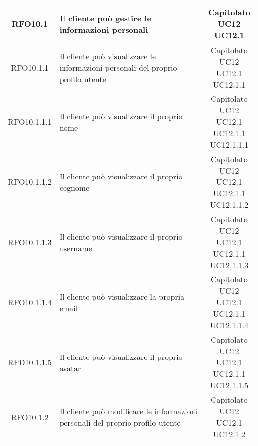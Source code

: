 \begin{longtable}{|c|p{8cm}|c|}
\hypertarget{RFO10.1}{RFO10.1} & Il cliente può gestire le informazioni personali & \makecell*{Capitolato\\UC12\\UC12.1} \\
\hline

\hypertarget{RFO10.1.1}{RFO10.1.1} & Il cliente può visualizzare le informazioni personali del proprio profilo utente &\makecell*{Capitolato\\UC12\\UC12.1\\UC12.1.1} \\
\hline

\hypertarget{RFO10.1.1.1}{RFO10.1.1.1} & Il cliente può visualizzare il proprio nome & \makecell*{Capitolato\\UC12\\UC12.1\\UC12.1.1\\UC12.1.1.1} \\
\hline
\hypertarget{RFO10.1.1.2}{RFO10.1.1.2} & Il cliente può visualizzare il proprio cognome & \makecell*{Capitolato\\UC12\\UC12.1\\UC12.1.1\\UC12.1.1.2} \\
\hline
\hypertarget{RFO10.1.1.3}{RFO10.1.1.3} & Il cliente può visualizzare il proprio username & \makecell*{Capitolato\\UC12\\UC12.1\\UC12.1.1\\UC12.1.1.3} \\
\hline
\hypertarget{RFO10.1.1.4}{RFO10.1.1.4} & Il cliente può visualizzare la propria email & \makecell*{Capitolato\\UC12\\UC12.1\\UC12.1.1\\UC12.1.1.4} \\
\hline
\hypertarget{RFD10.1.1.5}{RFD10.1.1.5} & Il cliente può visualizzare il proprio avatar & \makecell*{Capitolato\\UC12\\UC12.1\\UC12.1.1\\UC12.1.1.5} \\
\hline

\hypertarget{RFO10.1.2}{RFO10.1.2} & Il cliente può modificare le informazioni personali del proprio profilo utente &\makecell*{Capitolato\\UC12\\UC12.1\\UC12.1.2} \\
\hline


\end{longtable}
